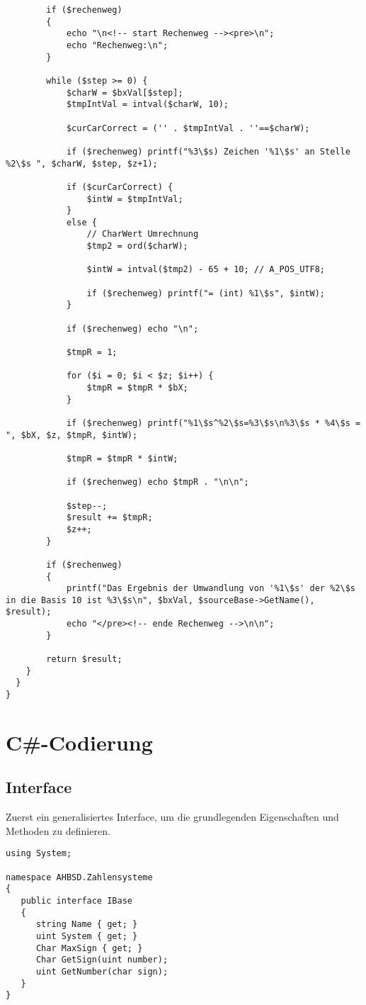 \begin{lstlisting}
    	if ($rechenweg)
    	{
    		echo "\n<!-- start Rechenweg --><pre>\n";
    		echo "Rechenweg:\n";
    	}
    	
    	while ($step >= 0) {
    		$charW = $bxVal[$step];
    		$tmpIntVal = intval($charW, 10);
    		
    		$curCarCorrect = ('' . $tmpIntVal . ''==$charW); 
    		    		
    		if ($rechenweg) printf("%3\$s) Zeichen '%1\$s' an Stelle %2\$s ", $charW, $step, $z+1); 
    		
    		if ($curCarCorrect) {
    			$intW = $tmpIntVal;
    		}
    		else {
    			// CharWert Umrechnung
    			$tmp2 = ord($charW);
    			    			
    			$intW = intval($tmp2) - 65 + 10; // A_POS_UTF8;
    			
    			if ($rechenweg) printf("= (int) %1\$s", $intW);
    		}
    		
    		if ($rechenweg) echo "\n";
    		
    		$tmpR = 1;
    		
    		for ($i = 0; $i < $z; $i++) {
    			$tmpR = $tmpR * $bX;
    		}
    		
    		if ($rechenweg) printf("%1\$s^%2\$s=%3\$s\n%3\$s * %4\$s = ", $bX, $z, $tmpR, $intW);
    		
    		$tmpR = $tmpR * $intW;
    		
    		if ($rechenweg) echo $tmpR . "\n\n";
    		
    		$step--;
    		$result += $tmpR;
    		$z++;
    	}
    	
    	if ($rechenweg)
    	{
    		printf("Das Ergebnis der Umwandlung von '%1\$s' der %2\$s in die Basis 10 ist %3\$s\n", $bxVal, $sourceBase->GetName(), $result);
    		echo "</pre><!-- ende Rechenweg -->\n\n";
    	}
    	
    	return $result;
    }
  }
}
\end{lstlisting}

\section{C\#-Codierung}
\subsection{Interface}
Zuerst ein generalisiertes Interface, um die grundlegenden Eigenschaften und Methoden zu definieren.
\label{listing:C_sharp:interface}
\begin{lstlisting}
using System;

namespace AHBSD.Zahlensysteme
{
   public interface IBase
   {
      string Name { get; }
      uint System { get; }
      Char MaxSign { get; }
      Char GetSign(uint number);
      uint GetNumber(char sign);
   }
}
\end{lstlisting}
